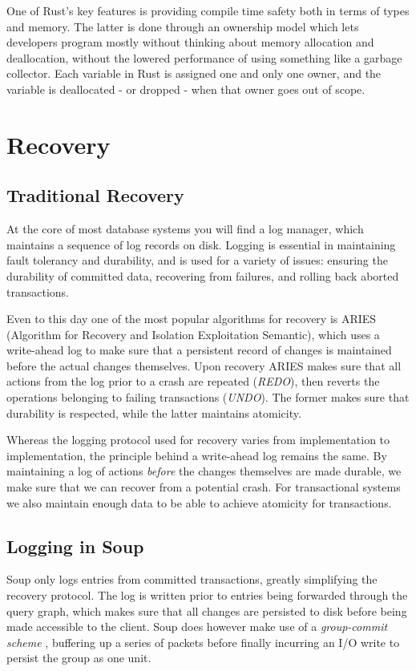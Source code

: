\documentclass[b5paper]{report}
\begin{document}
One of Rust's key features is providing compile time safety both in terms of
types and memory. The latter is done through an ownership model which lets
developers program mostly without thinking about memory allocation and
deallocation, without the lowered performance of using something like a garbage
collector. Each variable in Rust is assigned one and only one owner, and the
variable is deallocated - or dropped - when that owner goes out of scope.

\chapter{Recovery}
\section{Traditional Recovery}
At the core of most database systems you will find a log manager, which
maintains a sequence of log records on disk. Logging is essential in maintaining
fault tolerancy and durability, and is used for a variety of issues: ensuring
the durability of committed data, recovering from failures, and rolling back
aborted transactions.

Even to this day one of the most popular algorithms for recovery is ARIES
\cite{aries} (Algorithm for Recovery and Isolation Exploitation Semantic), which
uses a write-ahead log to make sure that a persistent record of changes is
maintained before the actual changes themselves. Upon recovery ARIES makes sure
that all actions from the log prior to a crash are repeated (\textit{REDO}),
then reverts the operations belonging to failing transactions (\textit{UNDO}).
The former makes sure that durability is respected, while the latter maintains
atomicity.

Whereas the logging protocol used for recovery varies from implementation to
implementation, the principle behind a write-ahead log remains the same. By
maintaining a log of actions \textit{before} the changes themselves are made
durable, we make sure that we can recover from a potential crash. For
transactional systems we also maintain enough data to be able to achieve
atomicity for transactions.

\section{Logging in Soup}
Soup only logs entries from committed transactions, greatly simplifying the
recovery protocol. The log is written prior to entries being forwarded
through the query graph, which makes sure that all changes are persisted to disk
before being made accessible to the client. Soup does however make use of a
\textit{group-commit scheme} \cite{main-memory}, buffering up a series of
packets before finally incurring an I/O write to persist the group as one unit.
\end{document}
